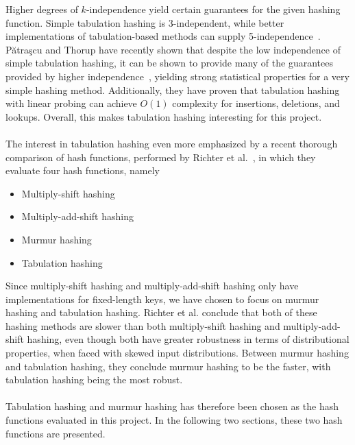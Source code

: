 \documentclass[11pt]{report} %
\begin{document}
Higher degrees of $k$-independence yield certain guarantees for the given hashing function. Simple tabulation hashing is 3-independent, while better implementations of tabulation-based methods can supply 5-independence~\cite{TZ09}. Pătraşcu and Thorup have recently shown that despite the low independence of simple tabulation hashing, it can be shown to provide many of the guarantees provided by higher independence~\cite{PT11}, yielding strong statistical properties for a very simple hashing method. Additionally, they have proven that tabulation hashing with linear probing can achieve $O(1)$ complexity for insertions, deletions, and lookups. Overall, this makes tabulation hashing interesting for this project.\\
\\
The interest in tabulation hashing even more emphasized by a recent thorough comparison of hash functions, performed by Richter et al.~\cite{RAD15}, in which they evaluate four hash functions, namely
\begin{itemize}
\item Multiply-shift hashing
\item Multiply-add-shift hashing
\item Murmur hashing
\item Tabulation hashing
\end{itemize}
\noindent
Since multiply-shift hashing and multiply-add-shift hashing only have implementations for fixed-length keys, we have chosen to focus on murmur hashing and tabulation hashing. Richter et al. conclude that both of these hashing methods are slower than both multiply-shift hashing and multiply-add-shift hashing, even though both have greater robustness in terms of distributional properties, when faced with skewed input distributions. Between murmur hashing and tabulation hashing, they conclude murmur hashing to be the faster, with tabulation hashing being the most robust. \\
\\
Tabulation hashing and murmur hashing has therefore been chosen as the hash functions evaluated in this project. In the following two sections, these two hash functions are presented.
\end{document}
